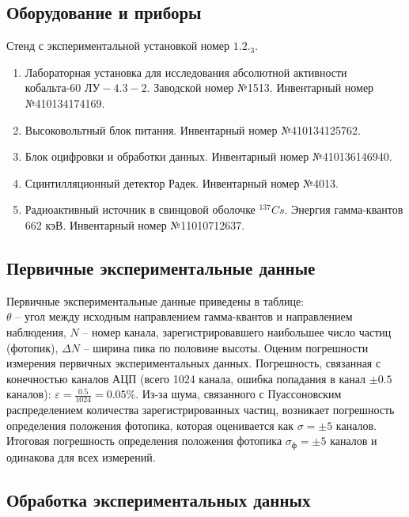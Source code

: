 \documentclass[10pt,a4paper]{article}
\begin{document}
	\subsection*{Оборудование и приборы}
		
	Стенд с экспериментальной установкой номер $1.2._3$.
	\begin{enumerate}
		\item Лабораторная установка для исследования абсолютной активности кобальта-60 $ЛУ-4.3-2$. Заводской номер №1513. Инвентарный номер №410134174169.
				
		\item Высоковольтный блок питания. Инвентарный номер №410134125762.
		
		\item Блок оцифровки и обработки данных. Инвентарный номер №410136146940.
		
		\item Сцинтилляционный детектор Радек. Инвентарный номер №4013.
				
		\item Радиоактивный источник в свинцовой оболочке ${}^{137}Cs$. Энергия гамма-квантов 662 кэВ. Инвентарный номер №11010712637.
	\end{enumerate}
	
	\subsection*{Первичные экспериментальные данные}
	
	Первичные экспериментальные данные приведены в таблице:\\
	
	
	$\theta$ -- угол между исходным направлением гамма-квантов и направлением наблюдения, $N$ -- номер канала, зарегистрировавшего наибольшее число частиц (фотопик), $\Delta N$ -- ширина пика по половине высоты. Оценим погрешности измерения первичных экспериментальных данных. Погрешность, связанная с конечностью каналов АЦП (всего 1024 канала, ошибка попадания в канал $\pm 0.5$ каналов): $\varepsilon = \frac{0.5}{1024} = 0.05 \%$. Из-за шума, связанного с Пуассоновским распределением количества зарегистрированных частиц, возникает погрешность определения положения фотопика, которая оценивается как $\sigma = \pm 5$ каналов. Итоговая погрешность определения положения фотопика $\sigma_ф = \pm 5$ каналов и одинакова для всех измерений.
	
	\subsection*{Обработка экспериментальных данных}
	
\end{document}
